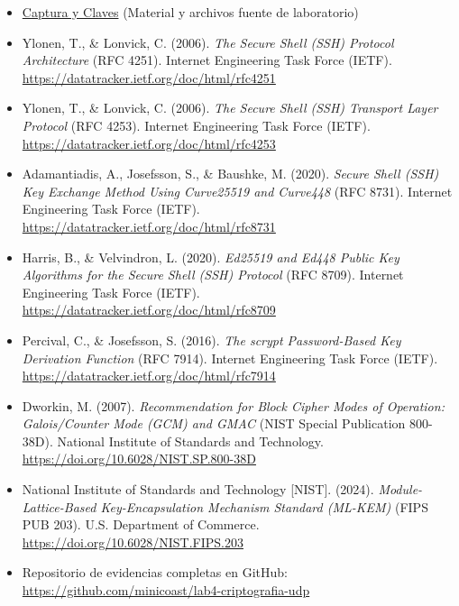 \documentclass[letter,12pt]{article}
\begin{document}
\begin{itemize}
    \item \href{https://drive.google.com/drive/folders/1rXMp5y9WeBR36iytc4RBaqXKWf3ea-WU}{Captura y Claves} (Material y archivos fuente de laboratorio)
    \item Ylonen, T., \& Lonvick, C. (2006). \textit{The Secure Shell (SSH) Protocol Architecture} (RFC 4251). Internet Engineering Task Force (IETF). \url{https://datatracker.ietf.org/doc/html/rfc4251}
    \item Ylonen, T., \& Lonvick, C. (2006). \textit{The Secure Shell (SSH) Transport Layer Protocol} (RFC 4253). Internet Engineering Task Force (IETF). \url{https://datatracker.ietf.org/doc/html/rfc4253}
    \item Adamantiadis, A., Josefsson, S., \& Baushke, M. (2020). \textit{Secure Shell (SSH) Key Exchange Method Using Curve25519 and Curve448} (RFC 8731). Internet Engineering Task Force (IETF). \url{https://datatracker.ietf.org/doc/html/rfc8731}
    \item Harris, B., \& Velvindron, L. (2020). \textit{Ed25519 and Ed448 Public Key Algorithms for the Secure Shell (SSH) Protocol} (RFC 8709). Internet Engineering Task Force (IETF). \url{https://datatracker.ietf.org/doc/html/rfc8709}
    \item Percival, C., \& Josefsson, S. (2016). \textit{The scrypt Password-Based Key Derivation Function} (RFC 7914). Internet Engineering Task Force (IETF). \url{https://datatracker.ietf.org/doc/html/rfc7914}
    \item Dworkin, M. (2007). \textit{Recommendation for Block Cipher Modes of Operation: Galois/Counter Mode (GCM) and GMAC} (NIST Special Publication 800-38D). National Institute of Standards and Technology. \url{https://doi.org/10.6028/NIST.SP.800-38D}
    \item National Institute of Standards and Technology [NIST]. (2024). \textit{Module-Lattice-Based Key-Encapsulation Mechanism Standard (ML-KEM)} (FIPS PUB 203). U.S. Department of Commerce. \url{https://doi.org/10.6028/NIST.FIPS.203}
    \item Repositorio de evidencias completas en GitHub:\\
    \url{https://github.com/minicoast/lab4-criptografia-udp}
\end{itemize}
\end{document}
